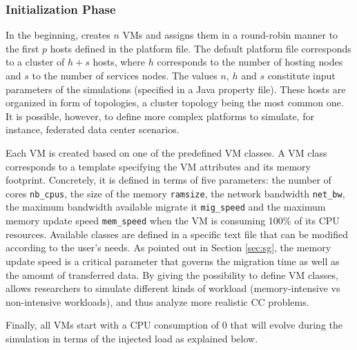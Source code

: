 \subsubsection{Initialization Phase}
In the beginning, \vmps creates $n$ VMs and assigns them in a
round-robin manner to the first $p$ hosts defined in the platform
file.  The default platform file corresponds to a cluster of $h+s$
hosts, where $h$ corresponds to the number of hosting nodes and $s$ to
the number of services nodes. The values $n$, $h$ and $s$ constitute
input parameters of the simulations (specified in a Java property
file).
These hosts are organized in form of topologies, a cluster topology
being the most common one. It is possible, however, to define more
complex platforms to simulate, for instance, federated data center scenarios.

Each VM is created based on one of the predefined VM classes. A VM
class corresponds to a template specifying the VM attributes and its
memory footprint. Concretely, it is
defined in terms of five parameters: the number of cores
\texttt{nb\_cpus}, the size of the memory \texttt{ramsize}, the
network bandwidth \texttt{net\_bw}, the maximum bandwidth available
migrate it \texttt{mig\_speed} and the maximum memory update speed
\texttt{mem\_speed} when the VM is consuming 100\% of its CPU
resources.
Available classes
are defined in a specific text file that can be modified according to
the user's needs.
As pointed out in Section \ref{sec:sg}, the memory update
speed is a critical parameter that governs the migration time as well
as the amount of transferred data.
By giving the possibility to define
VM classes, \vmps allows researchers to simulate different kinds of
workload (\ie memory-intensive vs non-intensive workloads), and thus
analyze more realistic CC problems.

%
Finally, all VMs start with a CPU consumption of 0 that will evolve
during the simulation in terms of the injected load as explained
below.


